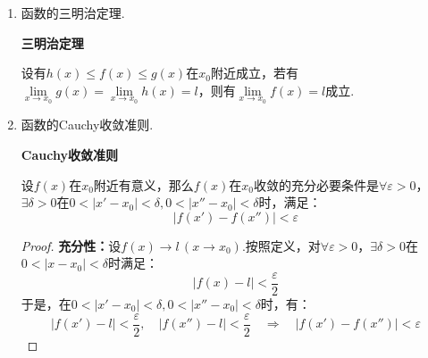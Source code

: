 \begin{enumerate}[property]
\begin{proof}
        \textbf{必要性：}假设$f(x)\nrightarrow l\,(x\to x_0)$，则$\exists \varepsilon_0>0$，对$\forall \delta>0$，$\exists x_\delta$满足$0<|x_\delta - x_0|<\delta$，又满足$|f(x_\delta)-l|\geqslant \varepsilon_0$.

        特别地，对$\delta = \frac{1}{n} > 0$，必然$\exists x_\delta = a_n$使得$0<|a_n-x_0|<\frac{1}{n}$，并且又有$|f(a_n)-l|\geqslant\varepsilon_0$.

        当$n\to\infty$时，根据三明治定理，$|x_n-x_0|\to 0$，进一步得到$a_n\to x_0 \,(n\to\infty)$.

        注意到，在$n\to\infty$时，一方面有$a_n\to x_0$，另一方面又有$f(a_n) \nrightarrow l$，与必要条件矛盾.故而假设不成立，必要性得证.
    \end{proof}

    这个性质主要用于证明极限不存在的情形.

    \begin{question}
        设$f(x)=\sin\dfrac{1}{x}$，证明$\lim\limits_{x\to 0}f(x)$不存在.
    \end{question}
    \begin{proof}
        取$a_n=\dfrac{1}{2n\pi}\to 0$，有$f(a_n)=\sin 2n\pi \to 0$.

        取$a_n'=\dfrac{1}{2n\pi+\pi/2}\to 0$，有$f(a_n)=\sin \left(2n\pi + \dfrac{\pi}{2}\right) \to 1$.

        则极限不存在.
    \end{proof}
    \item 函数的三明治定理.
    \begin{theorem}
        \textbf{三明治定理}

        设有$h(x)\leqslant f(x) \leqslant g(x)$在$x_0$附近成立，若有$\lim\limits_{x\to x_0}g(x) = \lim\limits_{x\to x_0}h(x) = l$，则有$\lim\limits_{x\to x_0}f(x)=l$成立.
    \end{theorem}
    \item 函数的Cauchy收敛准则.
    \begin{theorem}
        \textbf{Cauchy收敛准则}

        设$f(x)$在$x_0$附近有意义，那么$f(x)$在$x_0$收敛的充分必要条件是$\forall \varepsilon > 0$，$\exists \delta > 0$在$0<|x'-x_0|<\delta,0<|x''-x_0|<\delta$时，满足：
        \[|f(x')-f(x'')|<\varepsilon\]
    \end{theorem}
    \begin{proof}
        \textbf{充分性：}设$f(x)\to l\,(x\to x_0)$.按照定义，对$\forall \varepsilon>0$，$\exists \delta>0$在$0<|x-x_0|<\delta$时满足：
        \[|f(x)-l|<\frac{\varepsilon}{2}\]
        于是，在$0<|x'-x_0|<\delta,0<|x''-x_0|<\delta$时，有：
        \[|f(x')-l|<\frac{\varepsilon}{2},\quad|f(x'')-l|<\frac{\varepsilon}{2} \quad\Rightarrow\quad |f(x')-f(x'')|<\varepsilon\]


\end{proof}
\end{enumerate}
